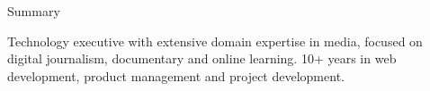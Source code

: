 \documentclass{resume} %
\begin{document}

\begin{rSection}{Summary}

Technology executive with extensive domain expertise in media, focused on digital journalism, documentary and online learning. 10+ years in web development, product management and project development.

\end{rSection}


\end{document}
